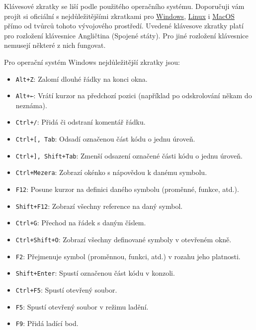 \documentclass[a4paper,11pt,twoside]{article}
\def\code#1{\textnormal{\texttt{#1}}}
\theoremstyle{red}
\theoremstyle{green}
\begin{document}
    Klávesové zkratky se liší podle použitého operačního systému.
    Doporučuji vám projít si oficiální  s nejdůležitějšími zkratkami pro
    \href{https://code.visualstudio.com/shortcuts/keyboard-shortcuts-windows.pdf}{Windows}, 
    \href{https://code.visualstudio.com/shortcuts/keyboard-shortcuts-linux.pdf}{Linux} i 
    \href{https://code.visualstudio.com/shortcuts/keyboard-shortcuts-macos.pdf}{MacOS} 
    přímo od tvůrců tohoto vývojového prostředí.
    Uvedené klávesove zkratky platí pro rozložení klávesnice Angličtina (Spojené státy).
    Pro jiné rozložení klávesnice nemusejí některé z nich fungovat.

    Pro operační systém Windows nejdůležitější zkratky jsou:
    \begin{itemize}
        \item \code{Alt+Z}: Zalomí dlouhé řádky na konci okna.
        \item \code{Alt+←}: Vrátí kurzor na předchozí pozici (například po odskrolování někam do neznáma).
        \item \code{Ctrl+/}: Přidá či odstraní komentář řádku.
        \item \code{Ctrl+[, Tab}: Odsadí označenou část kódu o jednu úroveň.
        \item \code{Ctrl+], Shift+Tab}: Zmenší odsazení označené části kódu o jednu úroveň.
        \item \code{Ctrl+Mezera}: Zobrazí okénko s nápovědou k danému symbolu.
        \item \code{F12}: Posune kurzor na definici daného symbolu (proměnné, funkce, atd.).
        \item \code{Shift+F12}: Zobrazí všechny reference na daný symbol.
        \item \code{Ctrl+G}: Přechod na řádek s daným číslem.
        \item \code{Ctrl+Shift+O}: Zobrazí všechny definované symboly v otevřeném okně.
        \item \code{F2}: Přejmenuje symbol (proměnnou, funkci, atd.) v rozahu jeho platnosti.
        \item \code{Shift+Enter}: Spustí označenou část kódu v konzoli.
        \item \code{Ctrl+F5}: Spustí otevřený soubor.
        \item \code{F5}: Spustí otevřený soubor v režimu ladění.
        \item \code{F9}: Přidá ladící bod.
    \end{itemize}
\end{document}
